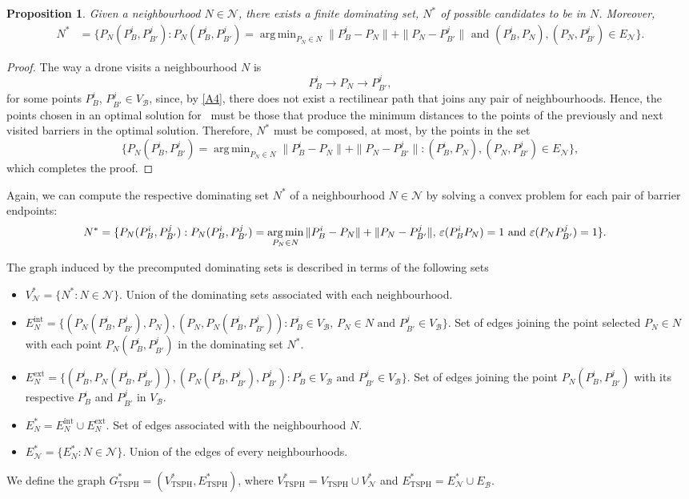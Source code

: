 \documentclass[a4paper,  review, authoryear, 1p.]{elsarticle}
\DeclareMathOperator*{\argmin}{arg\,min}
\newcommand{\TSPHN}{{\sf{H-TSPHN}\xspace }}
\newcommand{\VB}{{V^{}_{\mathcal B}}}
\newcommand{\EB}{{E^{}_{\mathcal B}}}
\newcommand{\EN}{{E^{}_{\mathcal N}}}
\newcommand{\VTSPH}{{V_{\text{TSPH}}}}
\newcommand{\GTSPHS}{{G^{*}_{\text{TSPH}}}}
\newcommand{\VTSPHS}{{V^{*}_{\text{TSPH}}}}
\newcommand{\ETSPHS}{{E^{*}_{\text{TSPH}}}}
\newtheorem{prop}{Proposition}
\begin{document}
		\begin{prop}
			Given a neighbourhood $N\in\mathcal N$, there exists a finite dominating set, $N^*$ of possible candidates to be in $N$. Moreover,
			\begin{align*}
				N^*&=\{P_N(P_{B}^i, P_{B'}^j):P_N(P_{B}^i, P_{B'}^j)=\argmin_{P_N\in N} \|P_B^i - P_N\| + \|P_N - P_{B'}^j\|\text{ and }(P_B^i, P_N), (P_N, P_{B'}^j)\in \EN\}.
			\end{align*}
		\end{prop}
		\begin{proof}
			The way a drone visits a neighbourhood $N$ is
			$$P_{B}^i\longrightarrow P_N\longrightarrow P_{B'}^j,$$
			for some points $P_B^i,\, P_{B'}^j\in \VB$, since, by \ref{A4}, there does not exist a rectilinear path that joins any pair of neighbourhoods. Hence, the points chosen in an optimal solution for \TSPHN \ must be those that produce the minimum distances to the points of the previously and next visited barriers in the optimal solution. Therefore, $N^*$ must be composed, at most, by the points in the set
			$$
			\{P_N(P_{B}^i, P_{B'}^j)=\argmin_{P_N\in N} \|P_B^i - P_N\| + \|P_N - P_{B'}^j\| :(P_B^i, P_N), (P_N, P_{B'}^j)\in \EN\},
			$$
			which completes the proof.
		\end{proof}
		Again, we can compute the respective dominating set $N^*$ of a neighbourhood $N\in\mathcal N$ by solving a convex problem for each pair of barrier endpoints: %
		\begin{align*}
			N^*&=\{P_N(P_{B}^i, P_{B'}^j):P_N(P_{B}^i, P_{B'}^j)=\argmin_{P_N\in N} \|P_B^i - P_N\| + \|P_N - P_{B'}^j\|,\,\varepsilonvar{P_B^i}{P_N} = 1 \text{ and } \varepsilonvar{P_N}{P_{B'}^j} = 1\}.
		\end{align*}
		
		
		The  graph induced by the precomputed dominating sets is described in terms of the following sets
		\begin{itemize}
			\item $V_\mathcal N^*=\{N^*:N\in\mathcal N\}$. Union of the dominating sets associated with each neighbourhood.
			\item $E_N^{\text{int}}=\{(P_N(P_B^i, P_{B'}^j), P_N), (P_N, P_N(P_B^i, P_{B'}^j)) :P_B^i\in\VB,\,P_N\in N\text{ and }P_{B'}^j\in\VB\}.$ Set of edges joining the point selected $P_N\in N$ with each point $P_N(P_B^i, P_{B'}^j)$ in the dominating set $N^*$.
			\item $E_N^{\text{ext}}=\{(P_B^i, P_N(P_B^i, P_{B'}^j)), (P_N(P_B^i, P_{B'}^j), P_{B'}^j):P_B^i\in\VB\text{ and }P_{B'}^j\in\VB\}.$ Set of edges joining the point $P_N(P_B^i, P_{B'}^j)$ with its respective $P_B^i$ and $P_{B'}^j$ in $\VB$.
			\item $E_N^*=E_N^{\text{int}}\cup E_N^{\text{ext}}$. Set of edges associated with the neighbourhood $N$.
			\item $E_\mathcal N^*= \{E_N^*:N\in\mathcal N\}.$ Union of the edges of every neighbourhoods.
		\end{itemize}
		We define the graph $\GTSPHS=(\VTSPHS, \ETSPHS)$, where $\VTSPHS=\VTSPH\cup V^*_\mathcal N$ and $\ETSPHS=E^*_\mathcal N\cup\EB$.
		
\end{document}
